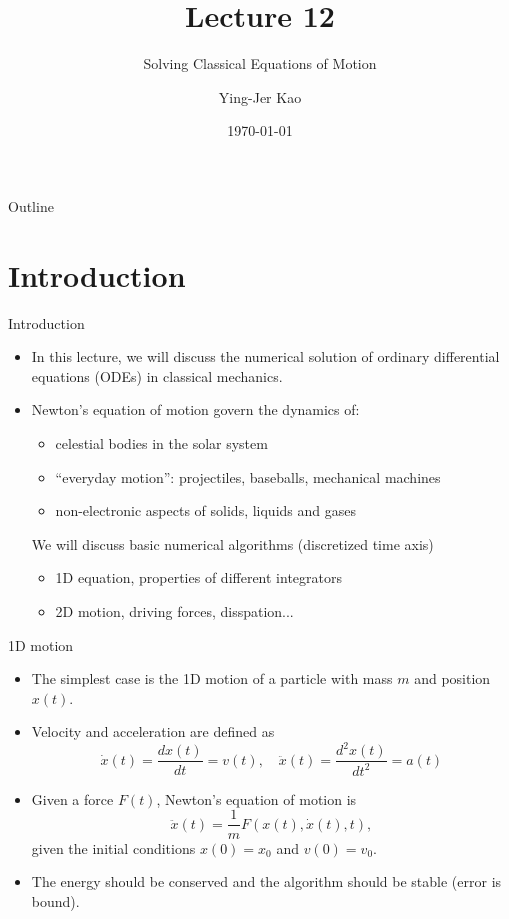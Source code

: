 \documentclass{beamer}
\title[Solving Classical Equations of Motion] %
{Lecture 12}
\subtitle
{Solving Classical Equations of Motion} %
\author[Ying-Jer Kao] %
{Ying-Jer Kao}
\institute[National Taiwan University] %
{
  Department of Physics\\
 National Taiwan University
  }
\date[Numerical Analysis and Programming] %
{\today}
\begin{document}
\begin{frame}
  \titlepage
\end{frame}

\begin{frame}{Outline}
  \tableofcontents
\end{frame}



\section[Introduction]{Introduction}
\begin{frame}{Introduction}
\begin{itemize}
\item In this lecture, we will discuss the numerical solution of 
ordinary differential equations (ODEs) in classical mechanics.
\item Newton's equation of motion govern the dynamics of:
\begin{itemize}
\item {celestial bodies} in the solar system
\item ``everyday motion'': projectiles, baseballs, mechanical machines
\item  non-electronic aspects of solids, liquids and gases
\end{itemize} 
We will discuss basic numerical algorithms (discretized time axis)
\begin{itemize}
\item 1D equation, properties of different integrators
\item 2D motion, driving forces, disspation...
\end{itemize}
\end{itemize}
\end{frame}

\begin{frame}{1D motion}
\begin{itemize}
\item The simplest case is the 1D motion of a particle with mass $m$ and position $x(t)$.
\item Velocity and acceleration are defined as
\[
\dot{x}(t)=\frac{d x(t)}{d t}=v(t), \quad \ddot{x}(t)=\frac{d^2 x(t)}{d t^2}=a(t)
\]
\item Given a force $F(t)$, Newton's equation of motion is
\[ 
\ddot{x}(t)=\frac{1}{m} F(x(t), \dot{x}(t),t), 
\]
given the initial conditions $x(0)=x_0$ and $v(0)=v_0$.
\item The energy should be conserved and the algorithm should be stable (error is bound).
\end{itemize}
\end{frame}
\end{document}
